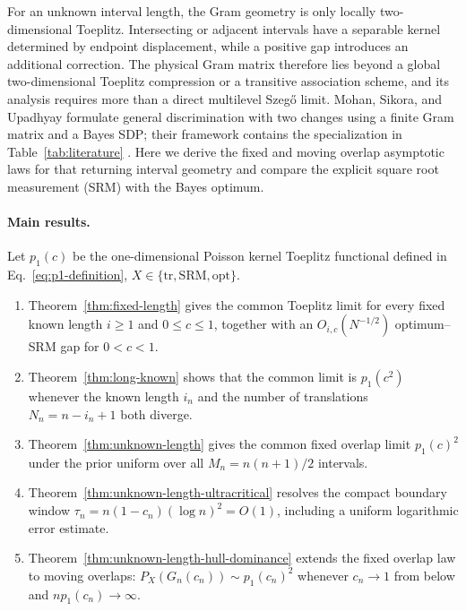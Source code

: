 For an unknown interval length, the Gram geometry is only locally
two-dimensional Toeplitz. Intersecting or adjacent intervals have a separable
kernel determined by endpoint displacement, while a positive gap introduces
an additional correction. The physical Gram matrix therefore lies beyond a
global two-dimensional Toeplitz compression or a transitive association
scheme, and its analysis requires more than a direct multilevel Szeg{\H o}
limit. Mohan, Sikora, and Upadhyay formulate general discrimination with two changes using
a finite Gram matrix and a Bayes SDP; their framework contains the
specialization in Table~\ref{tab:literature} \cite{mohan2023}. Here we derive
the fixed and moving overlap asymptotic laws for that returning interval
geometry and compare the explicit square root measurement (SRM) with the Bayes optimum.







\paragraph{Main results.}
Let \(p_1(c)\) be the one-dimensional Poisson kernel Toeplitz functional
defined in Eq.~\eqref{eq:p1-definition}, \(X\in\{\mathrm{tr},\mathrm{SRM},\mathrm{opt}\}\).

\begin{enumerate}
\def\labelenumi{\arabic{enumi}.}
\tightlist
\item
  Theorem~\ref{thm:fixed-length} gives the common Toeplitz limit for every fixed
  known length \(i\geq1\) and \(0\leq c\leq1\), together with an
  \(O_{i,c}(N^{-1/2})\) optimum--SRM gap for \(0<c<1\).
\item
  Theorem~\ref{thm:long-known} shows that the common limit is \(p_1(c^2)\)
  whenever the known length \(i_n\) and the number of translations
  \(N_n=n-i_n+1\) both diverge.
\item
  Theorem~\ref{thm:unknown-length} gives the common fixed overlap limit
  \(p_1(c)^2\) under the prior uniform over all
  \(M_n=n(n+1)/2\) intervals.
\item
  Theorem~\ref{thm:unknown-length-ultracritical} resolves the compact boundary
  window \(\tau_n=n(1-c_n)(\log n)^2=O(1)\), including a uniform logarithmic
  error estimate.
\item
  Theorem~\ref{thm:unknown-length-hull-dominance} extends the fixed overlap law to moving overlaps: \(P_X(G_n(c_n))\sim p_1(c_n)^2\) whenever \(c_n\to1\) from below and \(n p_1(c_n)\to\infty\).
\end{enumerate}

